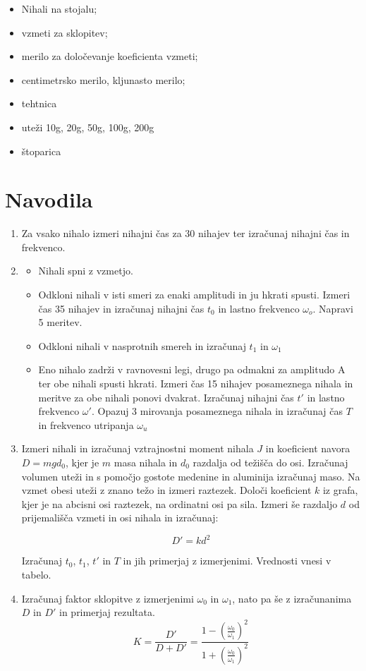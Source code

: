 \documentclass[a4paper]{report}
\begin{document}
\begin{itemize}
\item Nihali na stojalu;
\item vzmeti za sklopitev;
\item merilo za določevanje koeficienta vzmeti;
\item centimetrsko merilo, kljunasto merilo;
\item tehtnica
\item uteži 10g, 20g, 50g, 100g, 200g
\item štoparica
\end{itemize}

\endgroup

\begingroup

\let\clearpage\relax

\chapter*{Navodila}

\begin{enumerate}
\item Za vsako nihalo izmeri nihajni čas za 30 nihajev ter izračunaj nihajni čas in frekvenco.
\item \begin{itemize}
  \item Nihali spni z vzmetjo.
  \item Odkloni nihali v isti smeri za enaki amplitudi in ju hkrati spusti. Izmeri čas 35 nihajev in izračunaj nihajni čas $t_0$ in lastno frekvenco $\omega_o$. Napravi 5 meritev.
  \item Odkloni nihali v nasprotnih smereh in izračunaj $t_1$ in $\omega_1$
  \item Eno nihalo zadrži v ravnovesni legi, drugo pa odmakni za amplitudo A ter obe nihali spusti hkrati. Izmeri čas 15 nihajev posameznega nihala in meritve za obe nihali ponovi
    dvakrat. Izračunaj nihajni čas  $t'$ in lastno frekvenco $\omega'$. Opazuj 3 mirovanja posameznega nihala in izračunaj čas $T$ in frekvenco utripanja $\omega_u$
  \end{itemize}
  \item Izmeri nihali in izračunaj vztrajnostni moment nihala $J$ in koeficient navora $D = mgd_0 $, kjer je $m$ masa nihala in $d_0$ razdalja od težišča do osi. Izračunaj volumen uteži in s pomočjo gostote medenine in aluminija
  izračunaj maso. Na vzmet obesi uteži z znano težo in izmeri raztezek. Določi koeficient $k$ iz grafa, kjer je na abcisni osi raztezek, na ordinatni osi pa sila. Izmeri še razdaljo
  $d$ od prijemališča vzmeti in osi nihala in izračunaj:  

\[
    D' = kd^2
\]
  
  Izračunaj $t_0$, $t_1$, $t'$ in $T$ in jih primerjaj z izmerjenimi. Vrednosti vnesi v tabelo.
\item Izračunaj faktor sklopitve z izmerjenimi $\omega_0$ in $\omega_1$, nato pa še z izračunanima $D$ in $D'$ in primerjaj rezultata.
    \[K = \frac{D'}{D+D'} = \frac{1-(\frac{\omega_0}{\omega_1})^2}{1 + (\frac{\omega_0}{\omega_1})^2}\]
\end{enumerate}
\end{document}
